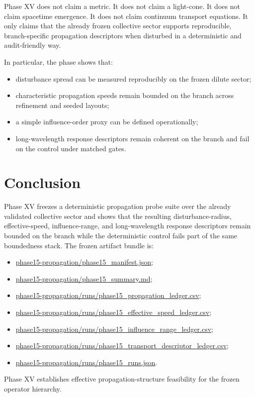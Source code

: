 \documentclass[11pt]{article}
\begin{document}
Phase XV does not claim a metric. It does not claim a light-cone. It does not claim spacetime emergence. It does not claim continuum transport equations. It only claims that the already frozen collective sector supports reproducible, branch-specific propagation descriptors when disturbed in a deterministic and audit-friendly way.

In particular, the phase shows that:
\begin{itemize}
\item disturbance spread can be measured reproducibly on the frozen dilute sector;
\item characteristic propagation speeds remain bounded on the branch across refinement and seeded layouts;
\item a simple influence-order proxy can be defined operationally;
\item long-wavelength response descriptors remain coherent on the branch and fail on the control under matched gates.
\end{itemize}

\section{Conclusion}

Phase XV freezes a deterministic propagation probe suite over the already validated collective sector and shows that the resulting disturbance-radius, effective-speed, influence-range, and long-wavelength response descriptors remain bounded on the branch while the deterministic control fails part of the same boundedness stack. The frozen artifact bundle is:
\begin{itemize}
\item \url{phase15-propagation/phase15_manifest.json};
\item \url{phase15-propagation/phase15_summary.md};
\item \url{phase15-propagation/runs/phase15_propagation_ledger.csv};
\item \url{phase15-propagation/runs/phase15_effective_speed_ledger.csv};
\item \url{phase15-propagation/runs/phase15_influence_range_ledger.csv};
\item \url{phase15-propagation/runs/phase15_transport_descriptor_ledger.csv};
\item \url{phase15-propagation/runs/phase15_runs.json}.
\end{itemize}

Phase XV establishes effective propagation-structure feasibility for the frozen operator hierarchy.
\end{document}

